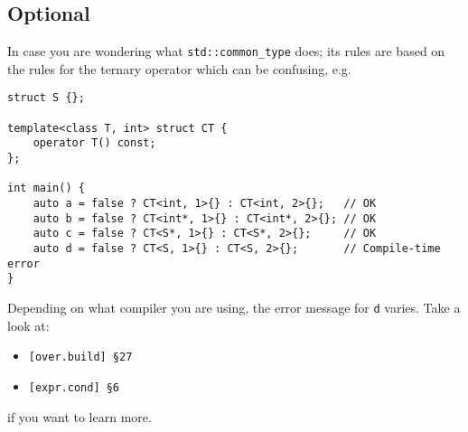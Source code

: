 \subsection{Optional}
In case you are wondering what \texttt{std::common\_type} does; its rules are based on the rules for the ternary operator which can be confusing, e.g.
\begin{lstlisting}[title=\href{https://godbolt.org/z/4TGmK6}{\texttt{godbolt.org/z/4TGmK6}}]
struct S {};

template<class T, int> struct CT {
    operator T() const;
};

int main() {
    auto a = false ? CT<int, 1>{} : CT<int, 2>{};   // OK
    auto b = false ? CT<int*, 1>{} : CT<int*, 2>{}; // OK
    auto c = false ? CT<S*, 1>{} : CT<S*, 2>{};     // OK
    auto d = false ? CT<S, 1>{} : CT<S, 2>{};       // Compile-time error
}
\end{lstlisting}
Depending on what compiler you are using, the error message for \texttt{d} varies. Take a look at:
\begin{itemize}
    \item \texttt{[over.build] \S27}
    \item \texttt{[expr.cond] \S6}
\end{itemize}
if you want to learn more.
